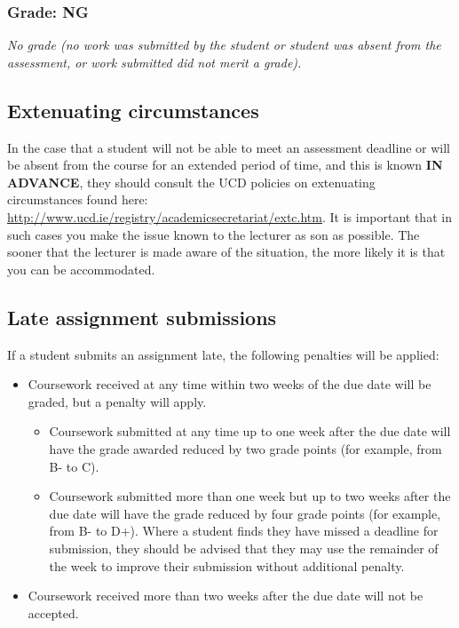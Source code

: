 \subsubsection*{Grade: NG}

\textit{No grade (no work was submitted by the student or student was absent from the assessment, or work submitted did not merit a grade).}

\subsection*{Extenuating circumstances}

	In the case that a student will not be able to meet an assessment deadline or will be absent from the course for an extended period of time, and this is known \textbf{IN ADVANCE}, they should consult the UCD policies on extenuating circumstances found here:
\url{http://www.ucd.ie/registry/academicsecretariat/extc.htm}. It is important that in such cases you make the issue known to the lecturer as son as possible. The sooner that the lecturer is made aware of the situation, the more likely it is that you can be accommodated.

\subsection*{Late assignment submissions}

	If a student submits an assignment late, the following penalties will be applied:

\begin{itemize}
	\item Coursework received at any time within two weeks of the due date will be graded, but a penalty will apply.
	\begin{itemize}
		\item Coursework submitted at any time up to one week after the due date will have the grade awarded reduced by two grade points (for example, from B- to C).
		\item Coursework submitted more than one week but up to two weeks after the due date will have the grade reduced by four grade points (for example, from B- to D+).
Where a student finds they have missed a deadline for submission, they should be advised that they may use the remainder of the week to improve their submission without additional penalty.
	\end{itemize}
	\item Coursework received more than two weeks after the due date will not be accepted.
\end{itemize}

